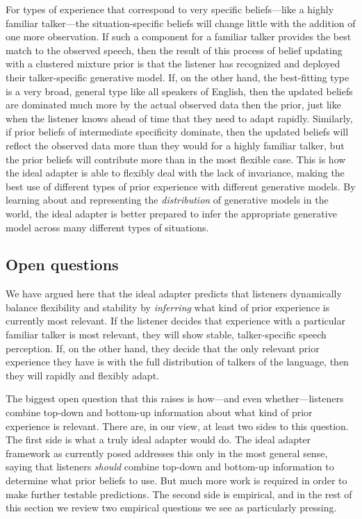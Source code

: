 For types of experience that correspond to very specific beliefs---like a highly familiar talker---the situation-specific beliefs will change little with the addition of one more observation.  If such a component for a familiar talker provides the best match to the observed speech, then the result of this process of belief updating with a clustered mixture prior is that the listener has recognized and deployed their talker-specific generative model.  If, on the other hand, the best-fitting type is a very broad, general type like all speakers of English, then the updated beliefs are dominated much more by the actual observed data then the prior, just like when the listener knows ahead of time that they need to adapt rapidly.  Similarly, if prior beliefs of intermediate specificity dominate, then the updated beliefs will reflect the observed data more than they would for a highly familiar talker, but the prior beliefs will contribute more than in the most flexible case.   This is how the ideal adapter is able to flexibly deal with the lack of invariance, making the best use of different types of prior experience with different generative models.  By learning about and representing the \emph{distribution} of generative models in the world, the ideal adapter is better prepared to infer the appropriate generative model across many different types of situations.  


\subsection{Open questions}
\label{sec:open-questions-infer-cluster}
\label{r1-cluster-questions}

We have argued here that the ideal adapter predicts that listeners dynamically balance flexibility and stability by \emph{inferring} what kind of prior experience is currently most relevant.  If the listener decides that experience with a particular familiar talker is most relevant, they will show stable, talker-specific speech perception.  If, on the other hand, they decide that the only relevant prior experience they have is with the full distribution of talkers of the language, then they will rapidly and flexibly adapt.  

The biggest open question that this raises is how---and even whether---listeners combine top-down and bottom-up information about what kind of prior experience is relevant.  There are, in our view, at least two sides to this question.  The first side is what a truly ideal adapter would do.  The ideal adapter framework as currently posed addresses this only in the most general sense, saying that listeners \emph{should} combine top-down and bottom-up information to determine what prior beliefs to use.  But much more work is required in order to make further testable predictions.  The second side is empirical, and in the rest of this section we review two empirical questions we see as particularly pressing.

